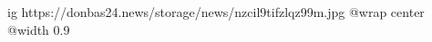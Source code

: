  
 
 
 
 

\ifcmt
  ig https://donbas24.news/storage/news/nzcil9tifzlqz99m.jpg
  @wrap center
  @width 0.9
\fi
